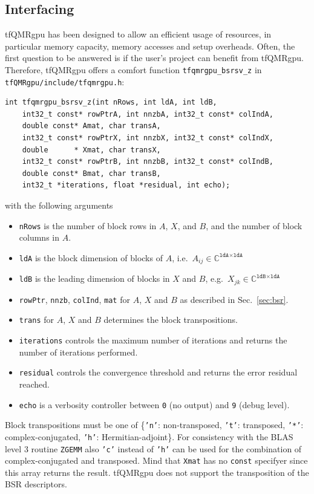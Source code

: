 \documentclass[oribibl]{llncs}
\newcommand{\ttt}[1]{\texttt{#1}}
\newcommand{\codename}{tfQMRgpu}
\begin{document}
\subsection{Interfacing}
%
\codename{} has been designed to allow an efficient usage of resources, in particular
memory capacity, memory accesses and setup overheads.
Often, the first question to be answered is if the user's project can benefit from \codename{}.
Therefore, \codename{} offers a comfort function \ttt{tfqmrgpu\_bsrsv\_z} in \ttt{tfQMRgpu/include/tfqmrgpu.h}:
\lstset{language=C}
\begin{lstlisting}
int tfqmrgpu_bsrsv_z(int nRows, int ldA, int ldB,
    int32_t const* rowPtrA, int nnzbA, int32_t const* colIndA,
    double const* Amat, char transA,
    int32_t const* rowPtrX, int nnzbX, int32_t const* colIndX,
    double      * Xmat, char transX,
    int32_t const* rowPtrB, int nnzbB, int32_t const* colIndB,
    double const* Bmat, char transB,
	int32_t *iterations, float *residual, int echo);
\end{lstlisting}
with the following arguments
\begin{itemize}
	\item \ttt{nRows} is the number of block rows in $A$, $X$, and $B$, and the number of block columns in $A$.
	\item \ttt{ldA} is the block dimension of blocks of $A$, i.e.~$A_{ij} \in \mathbb{C}^{\ttt{ldA}\times\ttt{ldA}}$
	\item \ttt{ldB} is the leading dimension of blocks in $X$ and $B$, e.g.~$X_{jk} \in \mathbb{C}^{\ttt{ldB}\times\ttt{ldA}}$
	\item \ttt{rowPtr}, \ttt{nnzb}, \ttt{colInd}, \ttt{mat} for $A$, $X$ and $B$ as described in Sec.~\ref{sec:bsr}.
	\item \ttt{trans} for $A$, $X$ and $B$ determines the block transpositions.
	\item \ttt{iterations} controls the maximum number of iterations and returns the number of iterations performed.
	\item \ttt{residual} controls the convergence threshold and returns the error residual reached.
	\item \ttt{echo} is a verbosity controller between \ttt{0} (no output) and \ttt{9} (debug level).
\end{itemize}

\noindent
Block transpositions must be one of \{\ttt{'n'}: non-transposed, \ttt{'t'}: transposed, \ttt{'*'}: complex-conjugated, \ttt{'h'}: Hermitian-adjoint\}. For consistency with the BLAS level 3 routine \ttt{ZGEMM} also \ttt{'c'} instead of \ttt{'h'} can be used for the combination of complex-conjugated and transposed.
Mind that \ttt{Xmat} has no \ttt{const} specifyer since this array returns the result.
\codename{} does not support the transposition of the BSR descriptors.
\end{document}
